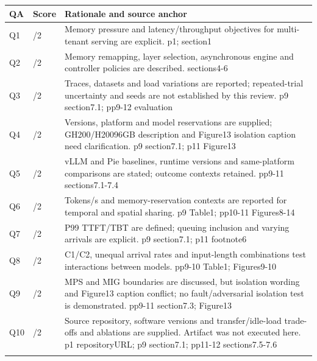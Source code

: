 \begin{longtable}{>{\raggedright\arraybackslash}p{}>{\raggedright\arraybackslash}p{}>{\raggedright\arraybackslash}p{}}
\toprule
\textbf{QA} & \textbf{Score} & \textbf{Rationale and source anchor}\\\midrule\endhead
Q1 & 2/2 & Memory pressure and latency/throughput objectives for multi-tenant serving are explicit. p1;\allowbreak{} section1\\\addlinespace
Q2 & 2/2 & Memory remapping,\allowbreak{} layer selection,\allowbreak{} asynchronous engine and controller policies are described. sections4-6\\\addlinespace
Q3 & 1/2 & Traces,\allowbreak{} datasets and load variations are reported;\allowbreak{} repeated-trial uncertainty and seeds are not established by this review. p9 section7.1;\allowbreak{} pp9-12 evaluation\\\addlinespace
Q4 & 1/2 & Versions,\allowbreak{} platform and model reservations are supplied;\allowbreak{} GH200/H20096GB description and Figure13 isolation caption need clarification. p9 section7.1;\allowbreak{} p11 Figure13\\\addlinespace
Q5 & 2/2 & vLLM and Pie baselines,\allowbreak{} runtime versions and same-platform comparisons are stated;\allowbreak{} outcome contexts retained. pp9-11 sections7.1-7.4\\\addlinespace
Q6 & 2/2 & Tokens/s and memory-reservation contexts are reported for temporal and spatial sharing. p9 Table1;\allowbreak{} pp10-11 Figures8-14\\\addlinespace
Q7 & 2/2 & P99 TTFT/TBT are defined;\allowbreak{} queuing inclusion and varying arrivals are explicit. p9 section7.1;\allowbreak{} p11 footnote6\\\addlinespace
Q8 & 2/2 & C1/C2,\allowbreak{} unequal arrival rates and input-length combinations test interactions between models. pp9-10 Table1;\allowbreak{} Figures9-10\\\addlinespace
Q9 & 1/2 & MPS and MIG boundaries are discussed,\allowbreak{} but isolation wording and Figure13 caption conflict;\allowbreak{} no fault/adversarial isolation test is demonstrated. pp9-11 section7.3;\allowbreak{} Figure13\\\addlinespace
Q10 & 2/2 & Source repository,\allowbreak{} software versions and transfer/idle-load trade-offs and ablations are supplied. Artifact was not executed here. p1 repositoryURL;\allowbreak{} p9 section7.1;\allowbreak{} pp11-12 sections7.5-7.6\\\addlinespace
\bottomrule\end{longtable}
